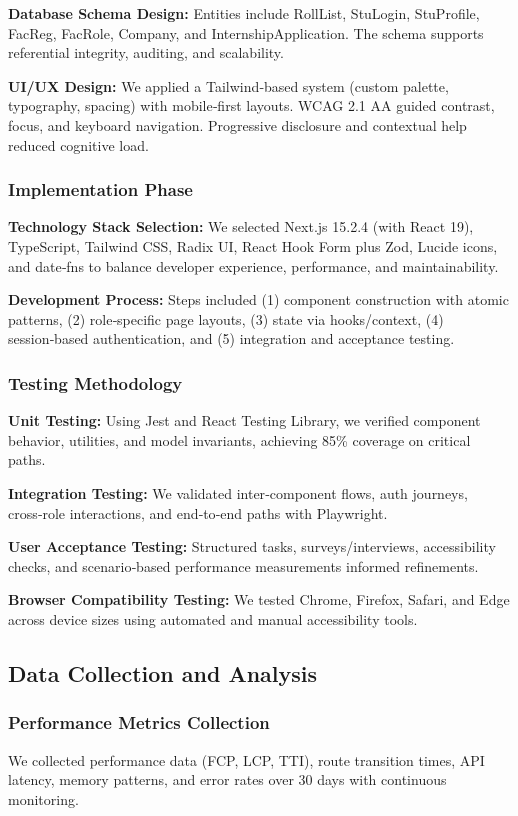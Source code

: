\documentclass[conference]{IEEEtran}
\begin{document}
\textbf{Database Schema Design:} Entities include RollList, StuLogin, StuProfile, FacReg, FacRole, Company, and InternshipApplication. The schema supports referential integrity, auditing, and scalability.

\textbf{UI/UX Design:} We applied a Tailwind‑based system (custom palette, typography, spacing) with mobile‑first layouts. WCAG 2.1 AA guided contrast, focus, and keyboard navigation. Progressive disclosure and contextual help reduced cognitive load.

\subsubsection{Implementation Phase}
\textbf{Technology Stack Selection:} We selected Next.js 15.2.4 (with React 19), TypeScript, Tailwind CSS, Radix UI, React Hook Form plus Zod, Lucide icons, and date‑fns to balance developer experience, performance, and maintainability.

\textbf{Development Process:} Steps included (1) component construction with atomic patterns, (2) role‑specific page layouts, (3) state via hooks/context, (4) session‑based authentication, and (5) integration and acceptance testing.

\subsubsection{Testing Methodology}
\textbf{Unit Testing:} Using Jest and React Testing Library, we verified component behavior, utilities, and model invariants, achieving 85\% coverage on critical paths.

\textbf{Integration Testing:} We validated inter‑component flows, auth journeys, cross‑role interactions, and end‑to‑end paths with Playwright.

\textbf{User Acceptance Testing:} Structured tasks, surveys/interviews, accessibility checks, and scenario‑based performance measurements informed refinements.

\textbf{Browser Compatibility Testing:} We tested Chrome, Firefox, Safari, and Edge across device sizes using automated and manual accessibility tools.

\subsection{Data Collection and Analysis}

\subsubsection{Performance Metrics Collection}
We collected performance data (FCP, LCP, TTI), route transition times, API latency, memory patterns, and error rates over 30 days with continuous monitoring.
\end{document}
